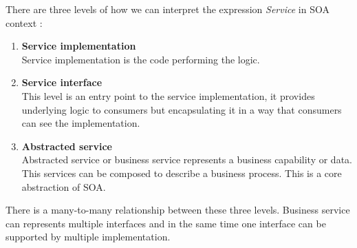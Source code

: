 There are three levels of how we can interpret the expression \emph{Service} in SOA context \cite{agile-architecture}:
\begin{enumerate}
  \item \textbf{Service implementation} \hfill \\
Service implementation is the code performing the logic.
  \item \textbf{Service interface} \hfill \\ 
This level is an entry point to the service implementation, it provides underlying logic to consumers but encapsulating it in a way that consumers can see the implementation. 
  \item \textbf{Abstracted service} \hfill \\
Abstracted service or business service represents a business capability or data. This services can be composed to describe a business process. This is a core abstraction of SOA.
\end{enumerate}

There is a many-to-many relationship between these three levels. Business service can represents multiple interfaces and in the same time one interface can be supported by multiple implementation.




\bigskip


